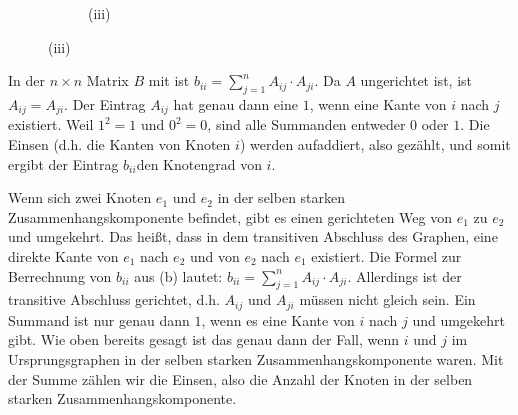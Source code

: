 \documentclass[11pt]{scrartcl} %
\begin{document}
\begin{compactenum}[(a)]
\begin{figure}[h]
\begin{subfigure}{0.3\textwidth}
\caption{(iii)}
\end{subfigure}
\end{figure}
\item In der $n\times n$ Matrix $B$ mit ist $b_{ii} = \sum_{j=1}^{n} A_{ij} \cdot A_{ji}$. Da $A$ ungerichtet ist, ist $A_{ij} = A_{ji}$. Der Eintrag $A_{ij}$ hat genau dann eine $1$, wenn eine Kante von $i$ nach $j$ existiert. Weil $1^2 = 1$ und $0^2 = 0$, sind alle Summanden entweder $0$ oder $1$. Die Einsen (d.h. die Kanten von Knoten $i$) werden aufaddiert, also gezählt, und somit ergibt der Eintrag $b_{ii}$den Knotengrad von $i$.
\item Wenn sich zwei Knoten $e_1$ und $e_2$ in der selben starken Zusammenhangskomponente befindet, gibt es einen gerichteten Weg von $e_1$ zu $e_2$ und umgekehrt. Das heißt, dass in dem transitiven Abschluss des Graphen, eine direkte Kante von $e_1$ nach $e_2$ und von $e_2$ nach $e_1$ existiert.
Die Formel zur Berrechnung von $b_{ii}$ aus (b) lautet: $b_{ii} = \sum_{j=1}^{n} A_{ij} \cdot A_{ji}$. Allerdings ist der transitive Abschluss gerichtet, d.h. $A_{ij}$ und $A_{ji}$ müssen nicht gleich sein. Ein Summand ist nur genau dann $1$, wenn es eine Kante von $i$ nach $j$ und umgekehrt gibt. Wie oben bereits gesagt ist das genau dann der Fall, wenn $i$ und $j$ im Ursprungsgraphen in der selben starken Zusammenhangskomponente waren. Mit der Summe zählen wir die Einsen, also die Anzahl der Knoten in der selben starken Zusammenhangskomponente.
\end{compactenum}
\newpage
\end{document}
